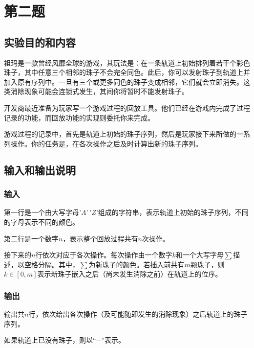 \documentclass[UTF8]{ctexart}
\begin{document}
\section{第二题}
\subsection{实验目的和内容}
	\indent 祖玛是一款曾经风靡全球的游戏，其玩法是：在一条轨道上初始排列着若干个彩色珠子，其中任意三个相邻的珠子不会完全同色。此后，你可以发射珠子到轨道上并加入原有序列中。一旦有三个或更多同色的珠子变成相邻，它们就会立即消失。这类消除现象可能会连锁式发生，其间你将暂时不能发射珠子。

\indent 开发商最近准备为玩家写一个游戏过程的回放工具。他们已经在游戏内完成了过程记录的功能，而回放功能的实现则委托你来完成。

\indent 游戏过程的记录中，首先是轨道上初始的珠子序列，然后是玩家接下来所做的一系列操作。你的任务是，在各次操作之后及时计算出新的珠子序列。
\subsection{输入和输出说明}
	\subsubsection{输入}
	\indent 第一行是一个由大写字母$’A’~’Z’$组成的字符串，表示轨道上初始的珠子序列，不同的字母表示不同的颜色。

\indent 第二行是一个数字$n$，表示整个回放过程共有$n$次操作。

\indent 接下来的$n$行依次对应于各次操作。每次操作由一个数字$k$和一个大写字母$\sum$描述，以空格分隔。其中，$\sum$为新珠子的颜色。若插入前共有$m$颗珠子，则$k\in[0, m]$表示新珠子嵌入之后（尚未发生消除之前）在轨道上的位序。
	\subsubsection{输出}
	\indent 输出共$n$行，依次给出各次操作（及可能随即发生的消除现象）之后轨道上的珠子序列。

\indent 如果轨道上已没有珠子，则以“$-$”表示。
\end{document}
